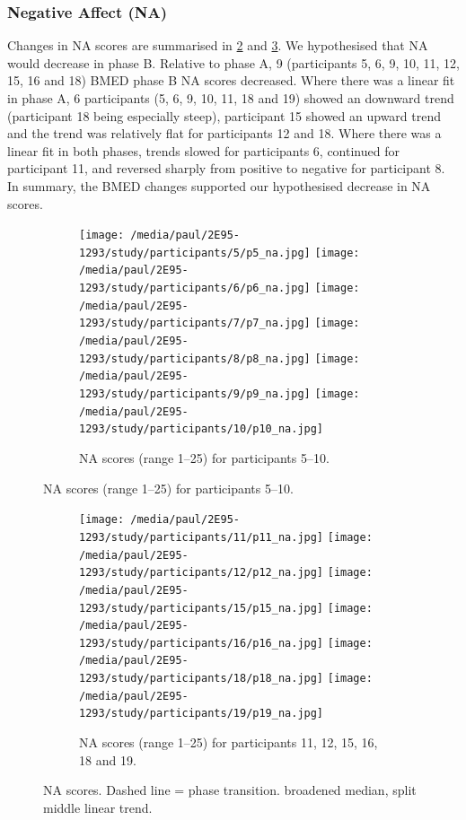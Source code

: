 \documentclass[man,floatsintext,a4paper,biblatex]{apa6}\usepackage[]{graphicx}\usepackage[]{color}
\newcommand\strokeA{\tikz[baseline=-.5ex]{ \draw[black,thick,align=center] (0,0) -- (2ex,0); }}
\newcommand\strokeB{\tikz[baseline=-.5ex]{ \draw[red,thick,dotted] (0,0) -- (2ex,0); }}
\begin{document}
\clearpage
\subsubsection{Negative Affect (NA)}

Changes in NA scores are summarised in \cref{fig:va-na-a} and
\cref{fig:va-na-b}. We hypothesised that NA would decrease in phase
B. Relative to phase A, 9 (participants 5, 6, 9, 10, 11, 12, 15, 16 and
18) BMED phase B NA scores decreased. Where there was a linear fit in
phase A, 6 participants (5, 6, 9, 10, 11, 18 and 19) showed an downward
trend (participant 18 being especially steep), participant 15 showed
an upward trend and the trend was relatively flat for participants 12
and 18.  Where there was a linear fit in both phases, trends slowed for
participants 6, continued for participant 11, and reversed sharply from
positive to negative for participant 8. In summary, the BMED changes
supported our hypothesised decrease in NA scores.

\begin{figure}[!htbp]
  \begin{subfigure}[!htbp]{\textwidth}
    \texttt{[image: /media/paul/2E95-1293/study/participants/5/p5\_na.jpg]}
    \texttt{[image: /media/paul/2E95-1293/study/participants/6/p6\_na.jpg]}
    \texttt{[image: /media/paul/2E95-1293/study/participants/7/p7\_na.jpg]}
    \texttt{[image: /media/paul/2E95-1293/study/participants/8/p8\_na.jpg]}
    \texttt{[image: /media/paul/2E95-1293/study/participants/9/p9\_na.jpg]}
    \texttt{[image: /media/paul/2E95-1293/study/participants/10/p10\_na.jpg]}
    \caption{NA scores (range 1--25) for participants 5--10.}
    \label{fig:va-na-a}
  \end{subfigure}
\end{figure}

\begin{figure}
\ContinuedFloat
  \begin{subfigure}[!htbp]{\textwidth}
    \texttt{[image: /media/paul/2E95-1293/study/participants/11/p11\_na.jpg]}
    \texttt{[image: /media/paul/2E95-1293/study/participants/12/p12\_na.jpg]}
    \texttt{[image: /media/paul/2E95-1293/study/participants/15/p15\_na.jpg]}
    \texttt{[image: /media/paul/2E95-1293/study/participants/16/p16\_na.jpg]}
    \texttt{[image: /media/paul/2E95-1293/study/participants/18/p18\_na.jpg]}
    \texttt{[image: /media/paul/2E95-1293/study/participants/19/p19\_na.jpg]}
    \caption{NA scores (range 1--25) for participants 11, 12, 15, 16, 18 and 19.}
    \label{fig:va-na-b}
  \end{subfigure}
\caption{NA scores. Dashed line = phase transition. \protect\strokeA{} broadened
median, \protect\strokeB{} split middle linear trend.}
\label{fig:na}
\end{figure}
\end{document}
